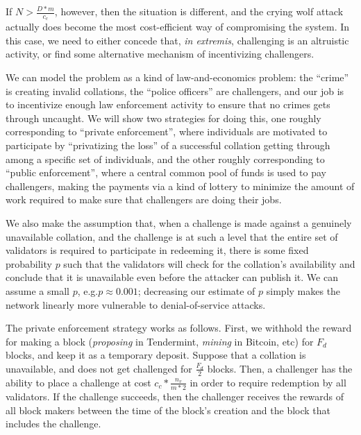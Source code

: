 \documentclass[11pt,a4paper]{article}
\makeatletter
\theoremstyle{plain}
\theoremstyle{definition}
\theoremstyle{remark}
\newcommand{\eg}{e.g.\@\xspace}
\makeatother
\begin{document}
If $N > \frac{D * m}{c_c}$, however, then the situation is different, and the crying wolf attack actually does become the most cost-efficient way of compromising the system. In this case, we need to either concede that, \emph{in extremis}, challenging is an altruistic activity, or find some alternative mechanism of incentivizing challengers.

We can model the problem as a kind of law-and-economics problem: the ``crime'' is creating invalid collations, the ``police officers'' are challengers, and our job is to incentivize enough law enforcement activity to ensure that no crimes gets through uncaught. We will show two strategies for doing this, one roughly corresponding to ``private enforcement'', where individuals are motivated to participate by ``privatizing the loss'' of a successful collation getting through among a specific set of individuals, and the other roughly corresponding to ``public enforcement'', where a central common pool of funds is used to pay challengers, making the payments via a kind of lottery to minimize the amount of work required to make sure that challengers are doing their jobs.

We also make the assumption that, when a challenge is made against a genuinely unavailable collation, and the challenge is at such a level that the entire set of validators is required to participate in redeeming it, there is some fixed probability $p$ such that the validators will check for the collation's availability and conclude that it is unavailable even before the attacker can publish it. We can assume a small $p$, \eg $p \approx 0.001$; decreasing our estimate of $p$ simply makes the network linearly more vulnerable to denial-of-service attacks.

The private enforcement strategy works as follows. First, we withhold the reward for making a block (\emph{proposing} in Tendermint, \emph{mining} in Bitcoin, etc) for $F_d$ blocks, and keep it as a temporary deposit. Suppose that a collation is unavailable, and does not get challenged for $\frac{F_d}{2}$ blocks. Then, a challenger has the ability to place a challenge at cost $c_c * \frac{n_v}{m * 2}$ in order to require redemption by all validators. If the challenge succeeds, then the challenger receives the rewards of all block makers between the time of the block's creation and the block that includes the challenge.
\end{document}
